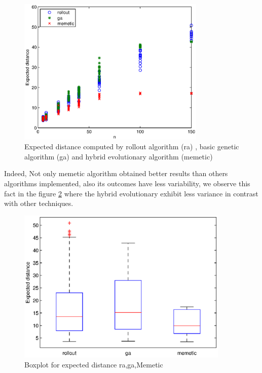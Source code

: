 \begin{figure}[!htbp]
  \begin{center}
   \includegraphics[width=0.8\textwidth]{Images/Chapter5/comparative_results.eps}
  \end{center}
    \caption{Expected distance computed by rollout algorithm (ra) , basic genetic algorithm (ga) and hybrid evolutionary algorithm (memetic)}\label{fig:comparative_results}
\end{figure}

Indeed, Not only memetic algorithm obtained better results than others algorithms implemented, also its outcomes have less variability, we observe this fact in the figure \ref{fig:comparative_results_box} where the hybrid evolutionary exhibit less variance in contrast with other techniques.

\begin{figure}[!htbp]
  \begin{center}
   \includegraphics[width=0.9\textwidth]{Images/Chapter5/comparative_results_box.eps}
  \end{center}
    \caption{Boxplot for expected distance ra,ga,Memetic}\label{fig:comparative_results_box}
\end{figure}




